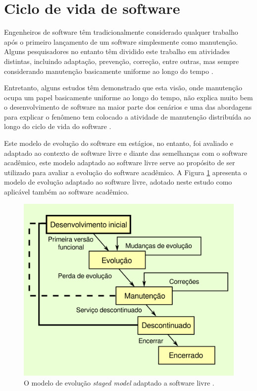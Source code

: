 \section{Ciclo de vida de software}
\label{sec:ciclo}

Engenheiros de software têm tradicionalmente considerado qualquer trabalho após
o primeiro lançamento de um software simplesmente como manutenção. Alguns
pesquisadores no entanto têm dividido este trabalho em atividades distintas, incluindo
adaptação, prevenção, correção, entre outras, mas sempre considerando manutenção
basicamente uniforme ao longo do tempo \cite{rajlich2000staged}.

Entretanto, alguns estudos têm demonstrado que esta visão, onde manutenção
ocupa um papel basicamente uniforme ao longo do tempo, não explica muito bem o
desenvolvimento de software na maior parte dos cenários e uma das abordagens
para explicar o fenômeno tem colocado a atividade de manutenção distribuída ao
longo do ciclo de vida do software \cite{rajlich2000staged}.

Este modelo de evolução do software em estágios, no entanto, foi avaliado e adaptado
ao contexto de software livre \cite{capiluppi2007adapting} e diante das
semelhanças com o software acadêmico, este modelo adaptado ao software livre serve ao propósito de ser
utilizado para
avaliar a evolução do software acadêmico. A Figura \ref{staged-model-foss-cycle}
apresenta o modelo de evolução adaptado ao software livre, adotado
neste estudo como aplicável também ao software acadêmico.

\begin{figure}[h]
  \center
  \includegraphics[scale=0.6]{imagens/staged-model-foss-cycle.png}
  \caption{O modelo de evolução {\it staged model} adaptado a software livre \cite{capiluppi2007adapting}.}
  \label{staged-model-foss-cycle}
\end{figure}

